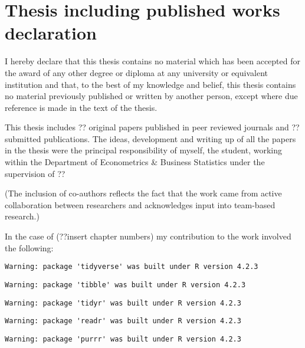 \documentclass{uniexeterthesis}
\begin{document}
\hypertarget{thesis-including-published-works-declaration}{%
\section*{Thesis including published works
declaration}\label{thesis-including-published-works-declaration}}


I hereby declare that this thesis contains no material which has been
accepted for the award of any other degree or diploma at any university
or equivalent institution and that, to the best of my knowledge and
belief, this thesis contains no material previously published or written
by another person, except where due reference is made in the text of the
thesis.

This thesis includes ?? original papers published in peer reviewed
journals and ?? submitted publications. The ideas, development and
writing up of all the papers in the thesis were the principal
responsibility of myself, the student, working within the Department of
Econometrics \& Business Statistics under the supervision of ??

(The inclusion of co-authors reflects the fact that the work came from
active collaboration between researchers and acknowledges input into
team-based research.)

In the case of (??insert chapter numbers) my contribution to the work
involved the following:

\begin{verbatim}
Warning: package 'tidyverse' was built under R version 4.2.3
\end{verbatim}

\begin{verbatim}
Warning: package 'tibble' was built under R version 4.2.3
\end{verbatim}

\begin{verbatim}
Warning: package 'tidyr' was built under R version 4.2.3
\end{verbatim}

\begin{verbatim}
Warning: package 'readr' was built under R version 4.2.3
\end{verbatim}

\begin{verbatim}
Warning: package 'purrr' was built under R version 4.2.3
\end{verbatim}
\end{document}
